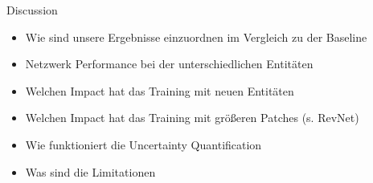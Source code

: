 \noindent
Discussion
\begin{itemize}[noitemsep]
    \item Wie sind unsere Ergebnisse einzuordnen im Vergleich zu der Baseline
    \item Netzwerk Performance bei der unterschiedlichen Entitäten
    \item Welchen Impact hat das Training mit neuen Entitäten
    \item Welchen Impact hat das Training mit größeren Patches (s. RevNet)
    \item Wie funktioniert die Uncertainty Quantification
    \item Was sind die Limitationen
\end{itemize}